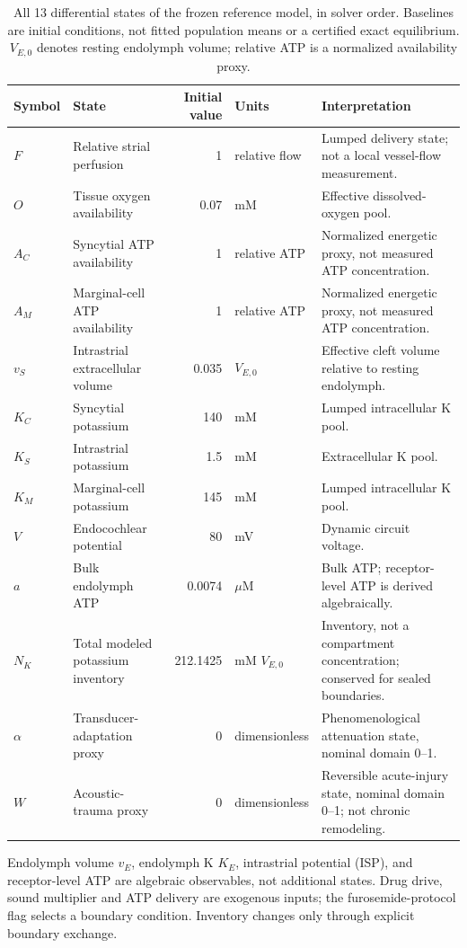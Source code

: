 \begin{table}[!t]
\caption{All 13 differential states of the frozen reference model, in solver order. Baselines are initial conditions, not fitted population means or a certified exact equilibrium. \(V_{E,0}\) denotes resting endolymph volume; relative ATP is a normalized availability proxy.}\label{tab:model-states}
\centering\small
\setlength{\tabcolsep}{4pt}\renewcommand{\arraystretch}{1.13}
\begin{tabular}{@{}>{\raggedright\arraybackslash}p{1.1cm}>{\raggedright\arraybackslash}p{3.6cm}r>{\raggedright\arraybackslash}p{2.1cm}>{\raggedright\arraybackslash}p{7.4cm}@{}}
\toprule \textbf{Symbol} & \textbf{State} & \textbf{Initial value} & \textbf{Units} & \textbf{Interpretation} \\ \midrule
\(F\) & Relative strial perfusion & 1 & relative flow & Lumped delivery state; not a local vessel-flow measurement. \\
\(O\) & Tissue oxygen availability & 0.07 & mM & Effective dissolved-oxygen pool. \\
\(A_C\) & Syncytial ATP availability & 1 & relative ATP & Normalized energetic proxy, not measured ATP concentration. \\
\(A_M\) & Marginal-cell ATP availability & 1 & relative ATP & Normalized energetic proxy, not measured ATP concentration. \\
\(v_S\) & Intrastrial extracellular volume & 0.035 & \(V_{E,0}\) & Effective cleft volume relative to resting endolymph. \\
\(K_C\) & Syncytial potassium & 140 & mM & Lumped intracellular K pool. \\
\(K_S\) & Intrastrial potassium & 1.5 & mM & Extracellular K pool. \\
\(K_M\) & Marginal-cell potassium & 145 & mM & Lumped intracellular K pool. \\
\(V\) & Endocochlear potential & 80 & mV & Dynamic circuit voltage. \\
\(a\) & Bulk endolymph ATP & 0.0074 & \(\mu\mathrm{M}\) & Bulk ATP; receptor-level ATP is derived algebraically. \\
\(N_K\) & Total modeled potassium inventory & 212.1425 & mM \(V_{E,0}\) & Inventory, not a compartment concentration; conserved for sealed boundaries. \\
\(\alpha\) & Transducer-adaptation proxy & 0 & dimensionless & Phenomenological attenuation state, nominal domain 0--1. \\
\(W\) & Acoustic-trauma proxy & 0 & dimensionless & Reversible acute-injury state, nominal domain 0--1; not chronic remodeling. \\
\bottomrule\end{tabular}
\par\smallskip\raggedright\footnotesize Endolymph volume \(v_E\), endolymph K \(K_E\), intrastrial potential (ISP), and receptor-level ATP are algebraic observables, not additional states. Drug drive, sound multiplier and ATP delivery are exogenous inputs; the furosemide-protocol flag selects a boundary condition. Inventory changes only through explicit boundary exchange.
\end{table}
